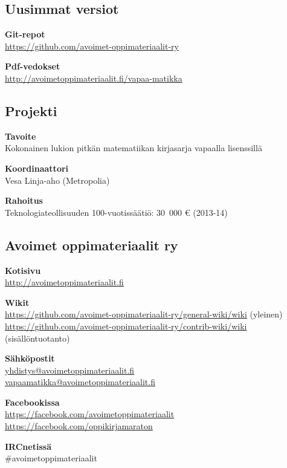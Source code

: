 \subsection*{Uusimmat versiot}

\textbf{Git-repot} \\
\url{https://github.com/avoimet-oppimateriaalit-ry}

\textbf{Pdf-vedokset} \\
\url{http://avoimetoppimateriaalit.fi/vapaa-matikka}

\subsection*{Projekti}

\textbf{Tavoite} \\
Kokonainen lukion pitkän matematiikan kirjasarja vapaalla lisenssillä

\textbf{Koordinaattori} \\
Vesa Linja-aho (Metropolia)

\textbf{Rahoitus} \\
Teknologiateollisuuden 100-vuotissäätiö: 30~000 \euro \; (2013-14)

\subsection*{Avoimet oppimateriaalit ry}

\textbf{Kotisivu} \\
\url{http://avoimetoppimateriaalit.fi}

\textbf{Wikit} \\
\url{https://github.com/avoimet-oppimateriaalit-ry/general-wiki/wiki} (yleinen) \\
\url{https://github.com/avoimet-oppimateriaalit-ry/contrib-wiki/wiki} (sisällöntuotanto)

\textbf{Sähköpostit} \\
\href{mailto:yhdistys@avoimetoppimateriaalit.fi}{yhdistys@avoimetoppimateriaalit.fi} \\
\href{mailto:vapaamatikka@avoimetoppimateriaalit.fi}{vapaamatikka@avoimetoppimateriaalit.fi}

\textbf{Facebookissa} \\
\url{https://facebook.com/avoimetoppimateriaalit} \\
\url{https://facebook.com/oppikirjamaraton}

\textbf{IRCnetissä} \\
\#avoimetoppimateriaalit
